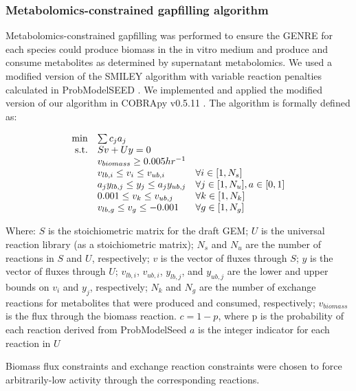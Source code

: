 \documentclass[11pt,twocolumn,notitlepage,openany,twoside]{book}
\begin{document}
\begin{refsection}
\subsubsection{Metabolomics-constrained gapfilling algorithm}

Metabolomics-constrained gapfilling was performed to ensure the GENRE for each species could produce biomass in the in vitro medium and produce and consume metabolites as determined by supernatant metabolomics. We used a modified version of the SMILEY algorithm \cite{Reed2006-qv} with variable reaction penalties calculated in ProbModelSEED \cite{Benedict2014-yo}. We implemented and applied the modified version of our algorithm in COBRApy v0.5.11 \cite{Ebrahim2013-eb}. The algorithm is formally defined as:

\begin{equation*}
\begin{array}{rlll}
\min & \multicolumn{2}{l} {\sum c_{j}a_{j} } \\
\textrm{s.t.} &	Sv + Uy = 0	 \\
&	v_{biomass} \geq 0.005 hr^{-1} \\
&	v_{lb,i} \leq v_i \leq v_{ub,i}	& 	\forall i \in [1, N_s] \\
&	a_{j}y_{lb,j} \leq y_j \leq a_{j}y_{ub,j}	&	\forall j \in [1, N_u], a \in{[0,1]} \\
&	0.001 \leq v_k \leq v_{ub,j}	&	\forall k \in [1, N_k] \\
&	v_{lb,g} \leq v_g \leq -0.001	&	\forall g \in [1, N_g] \\
\end{array}
\end{equation*}

Where:
  $S$ is the stoichiometric matrix for the draft GEM;
	$U$ is the universal reaction library (as a stoichiometric matrix);
	$N_s$ and $N_u$ are the number of reactions in $S$ and $U$, respectively;
	$v$ is the vector of fluxes through $S$;
 	$y$ is the vector of fluxes through $U$;
	$v_{lb,i}$, $v_{ub,i}$, $y_{lb,j}$, and $y_{ub,j}$ are the lower and upper bounds on $v_i$ and $y_j$, respectively;
  $N_k$ and $N_g$ are the number of exchange reactions for metabolites that were produced and consumed, respectively;
	$v_{biomass}$ is the flux through the biomass reaction.
  $c = 1 - p$, where p is the probability of each reaction derived from ProbModelSeed
  $a$ is the integer indicator for each reaction in $U$

Biomass flux constraints and exchange reaction constraints were chosen to force arbitrarily-low activity through the corresponding reactions.


\end{refsection}
\end{document}
